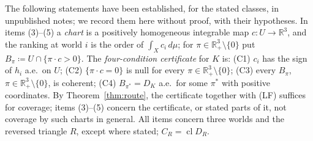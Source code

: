 \documentclass[11pt]{article}
\newcommand{\R}{\mathbb{R}}
\DeclareMathOperator{\cl}{cl}
\theoremstyle{plain}
\theoremstyle{definition}
\theoremstyle{remark}
\begin{document}
The following statements have been established, for the stated classes, in unpublished
notes; we record them here without proof, with their hypotheses. In items
(3)--(5) a \emph{chart} is a positively homogeneous integrable map $c:U\to\R^3$, and the
ranking at world $i$ is the order of $\int_Xc_i\,d\mu$; for $\pi\in\R^3_+\setminus\{0\}$
put $B_\pi\coloneqq U\cap\{\pi\cdot c>0\}$. The \emph{four-condition certificate} for $K$
is: (C1) $c_i$ has the sign of $h_i$ a.e.\ on $U$; (C2) $\{\pi\cdot c=0\}$ is null for
every $\pi\in\R^3_+\setminus\{0\}$; (C3) every $B_\pi$, $\pi\in\R^3_+\setminus\{0\}$, is
coherent; (C4) $B_{\pi^\ast}=D_K$ a.e.\ for some $\pi^\ast$ with positive coordinates. By
Theorem~\ref{thm:route}, the certificate together with (LF) suffices for coverage; items
(3)--(5) concern the certificate, or stated parts of it, not coverage by such charts in
general. All items concern three worlds and the reversed triangle $R$, except where
stated; $C_R=\cl D_R$.
\end{document}
